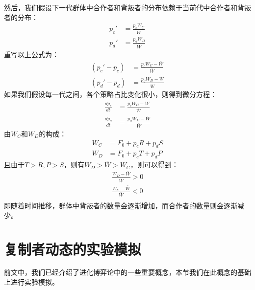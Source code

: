 \documentclass[twocolumn]{article}
\begin{document}
    然后，我们假设下一代群体中合作者和背叛者的分布依赖于当前代中合作者和背叛者的分布：
    \begin{equation}
        \begin{split}
            p_c'&=\frac{p_cW_C}{\bar W}\\
            p_d'&=\frac{p_dW_D}{\bar W}
        \end{split}
    \end{equation}
    重写以上公式为：
    \begin{equation}
        \begin{split}
            (p_c'-p_c)&=\frac{p_cW_C-\bar W}{\bar W}\\
            (p_d'-p_d)&=\frac{p_dW_D-\bar W}{\bar W}
        \end{split}
    \end{equation}
    如果我们假设每一代之间，各个策略占比变化很小，则得到微分方程：
    \begin{equation}
        \begin{split}
            \frac{dp_c}{dt}&=\frac{p_cW_C-\bar W}{\bar W}\\
            \frac{dp_d}{dt}&=\frac{p_dW_D-\bar W}{\bar W}
        \end{split}
    \end{equation}
    由$W_C$和$W_D$的构成：
    \begin{equation}
        \begin{split}
            W_C&=F_0+p_cR+p_dS\\
            W_D&=F_0+p_cT+p_dP
        \end{split}
    \end{equation}
    且由于$T>R, P>S$，则有$W_D>\bar W>W_C$，则可以得到：
    \begin{equation}
        \begin{split}
            \frac{W_D-\bar W}{\bar W}>0\\
            \frac{W_C-\bar W}{\bar W}<0\\
        \end{split}
    \end{equation}
    即随着时间推移，群体中背叛者的数量会逐渐增加，而合作者的数量则会逐渐减少。

    \section{复制者动态的实验模拟}
    前文中，我们已经介绍了进化博弈论中的一些重要概念，本节我们在此概念的基础上进行实验模拟。
\end{document}
